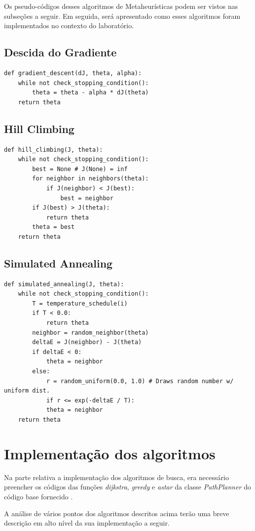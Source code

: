 \documentclass[conference]{IEEEtran}
\begin{document}
Os pseudo-códigos desses algoritmos de Metaheurísticas podem ser vistos nas subseções a seguir. Em seguida, será apresentado como esses algoritmos foram implementados no contexto do laboratório.

\subsection{Descida do Gradiente}
\begin{lstlisting}
def gradient_descent(dJ, theta, alpha):
	while not check_stopping_condition():
		theta = theta - alpha * dJ(theta)
	return theta
\end{lstlisting}

\subsection{Hill Climbing}
\begin{lstlisting}
def hill_climbing(J, theta):
	while not check_stopping_condition():
		best = None # J(None) = inf
		for neighbor in neighbors(theta):
			if J(neighbor) < J(best):
				best = neighbor
		if J(best) > J(theta):
			return theta
		theta = best
	return theta
\end{lstlisting}

\subsection{Simulated Annealing}
\begin{lstlisting}
def simulated_annealing(J, theta):
	while not check_stopping_condition():
		T = temperature_schedule(i)
		if T < 0.0:
			return theta
		neighbor = random_neighbor(theta)
		deltaE = J(neighbor) - J(theta)
		if deltaE < 0:
			theta = neighbor
		else:
			r = random_uniform(0.0, 1.0) # Draws random number w/ uniform dist.
			if r <= exp(-deltaE / T):
			theta = neighbor
	return theta
\end{lstlisting}

\section{Implementação dos algoritmos}
Na parte relativa a implementação dos algoritmos de busca, era necessário preencher os códigos das funções \textit{dijkstra}, \textit{greedy} e \textit{a\underline{\space}star} da classe \textit{PathPlanner} do código base fornecido \cite{b1}.

A análise de vários pontos dos algoritmos descritos acima terão uma breve descrição em alto nível da sua implementação a seguir. 
\end{document}
